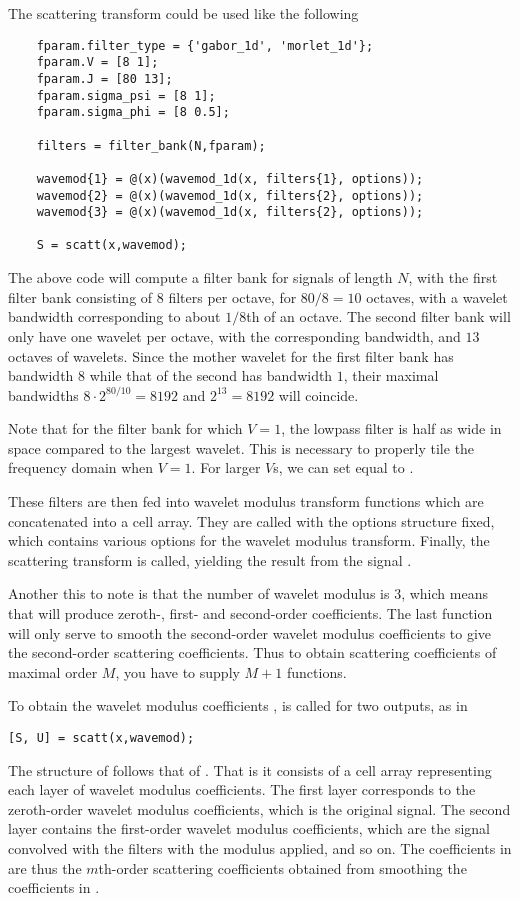 \documentclass[twocolumn]{article}
\begin{document}
The scattering transform could be used like the following
\begin{lstlisting}
	fparam.filter_type = {'gabor_1d', 'morlet_1d'};
	fparam.V = [8 1];
	fparam.J = [80 13];
	fparam.sigma_psi = [8 1];
	fparam.sigma_phi = [8 0.5];
	
	filters = filter_bank(N,fparam);
	
	wavemod{1} = @(x)(wavemod_1d(x, filters{1}, options));
	wavemod{2} = @(x)(wavemod_1d(x, filters{2}, options));
	wavemod{3} = @(x)(wavemod_1d(x, filters{2}, options));
	
	S = scatt(x,wavemod);
\end{lstlisting}
The above code will compute a filter bank for signals of length $N$, with the first filter bank consisting of $8$ filters per octave, for $80/8 = 10$ octaves, with a wavelet bandwidth corresponding to about $1/8$th of an octave. The second filter bank will only have one wavelet per octave, with the corresponding bandwidth, and $13$ octaves of wavelets. Since the mother wavelet for the first filter bank has bandwidth $8$ while that of the second has bandwidth $1$, their maximal bandwidths $8\cdot2^{80/10} = 8192$ and $2^{13} = 8192$ will coincide.

Note that for the filter bank for which $V = 1$, the lowpass filter is half as wide in space compared to the largest wavelet. This is necessary to properly tile the frequency domain when $V = 1$. For larger $V$s, we can set  equal to .

These filters are then fed into wavelet modulus transform functions which are concatenated into a cell array. They are called with the options structure  fixed, which contains various options for the wavelet modulus transform. Finally, the scattering transform is called, yielding the result  from the signal .

Another this to note is that the number of wavelet modulus is $3$, which means that  will produce zeroth-, first- and second-order coefficients. The last  function will only serve to smooth the second-order wavelet modulus coefficients to give the second-order scattering coefficients. Thus to obtain scattering coefficients of maximal order $M$, you have to supply $M+1$  functions.

To obtain the wavelet modulus coefficients ,  is called for two outputs, as in
\begin{lstlisting}
[S, U] = scatt(x,wavemod);
\end{lstlisting}
The structure of  follows that of . That is it consists of a cell array representing each layer of wavelet modulus coefficients. The first layer corresponds to the zeroth-order wavelet modulus coefficients, which is the original signal. The second layer contains the first-order wavelet modulus coefficients, which are the signal convolved with the filters with the modulus applied, and so on. The coefficients in  are thus the $m$th-order scattering coefficients obtained from smoothing the coefficients in .
\end{document}
